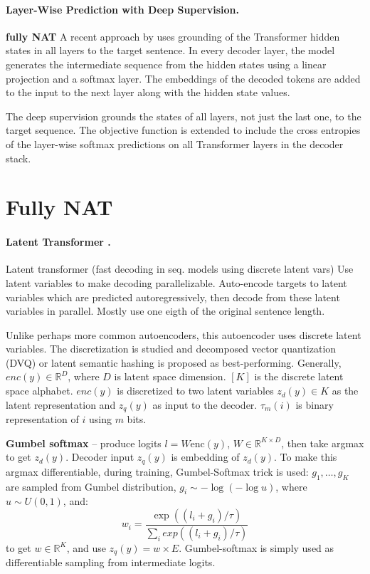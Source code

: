 \paragraph{Layer-Wise Prediction with Deep Supervision.}  \textbf{fully NAT}
 A recent
approach by \citet{huang-etal-2021-nonautoregressive} uses grounding of the
Transformer hidden states in all layers to the target sentence.  In every
decoder layer, the model generates the intermediate sequence from the hidden
states using a linear projection and a softmax layer. The embeddings of the
decoded tokens are added to the input to the next layer along with the hidden
state values.

The deep supervision grounds the states of all layers, not just the last one,
to the target sequence. The objective function is extended to include the cross
entropies of the layer-wise softmax predictions on all Transformer layers in
the decoder stack.


\section{Fully NAT}

\paragraph{Latent Transformer \citep{kaiser2018fast}.} Latent transformer (fast
decoding in seq. models using discrete latent vars) Use latent variables to make
decoding parallelizable. Auto-encode targets to latent variables which are
predicted autoregressively, then decode from these latent variables in
parallel. Mostly use one eigth of the original sentence length.

Unlike perhaps more common autoencoders, this autoencoder uses discrete latent
variables.  The discretization is studied and decomposed vector quantization
(DVQ) or latent semantic hashing is proposed as best-performing. Generally,
$enc(y) \in \mathbb{R}^D$, where $D$ is latent space dimension. $[K]$ is the
discrete latent space alphabet. $enc(y)$ is discretized to two latent variables
$z_d(y) \in K$ as the latent representation and $z_q(y)$ as input to the
decoder. $\tau_m(i)$ is binary representation of $i$ using $m$ bits.

\textbf{Gumbel softmax} -- produce logits $l = W \text{enc}(y)$,
$W \in \mathbb{R}^{K \times D}$, then take argmax to get $z_d(y)$. Decoder input
$z_q(y)$ is embedding of $z_d(y)$. To make this argmax differentiable, during
training, Gumbel-Softmax trick is used: $g_1, \ldots, g_K$ are sampled from
Gumbel distribution, $g_i \sim -\log(-\log u)$, where $u \sim U(0,1)$, and:
\begin{equation}
  w_i= \frac{\exp((l_i + g_i) / \tau) }{\sum_i exp((l_i + g_i)/\tau)}
\end{equation}
to get $w \in \mathbb{R}^K$, and use $z_q(y) = w \times E$. Gumbel-softmax is
simply used as differentiable sampling from intermediate logits.

